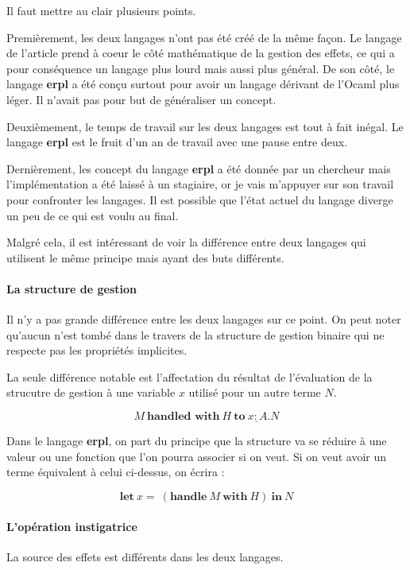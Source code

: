 Il faut mettre au clair plusieurs points. 

Premièrement, les deux langages n'ont pas été créé de la même façon.
Le langage de l'article prend à coeur le côté mathématique de la gestion des effets, ce qui a pour conséquence
un langage plus lourd mais aussi plus général. De son côté, le langage \textbf{erpl} a été conçu surtout pour 
avoir un langage dérivant de l'Ocaml plus léger. Il n'avait pas pour but de généraliser un concept.

Deuxièmement, le temps de travail sur les deux langages est tout à fait inégal. Le langage \textbf{erpl} est le fruit d'un 
an de travail avec une pause entre deux.

Dernièrement, les concept du langage \textbf{erpl} a été donnée par un chercheur mais l'implémentation a été laissé
à un stagiaire, or je vais m'appuyer sur son travail pour confronter les langages. Il est possible que l'état actuel
du langage diverge un peu de ce qui est voulu au final.

Malgré cela, il est intéressant de voir la différence entre deux langages qui utilisent le même principe mais ayant des buts 
différents.

\paragraph{La structure de gestion} Il n'y a pas grande différence entre les deux langages sur ce point.
On peut noter qu'aucun n'est tombé dans le travers de la structure de gestion binaire qui ne respecte pas
les propriétés implicites. 

La seule différence notable est l'affectation du résultat de l'évaluation de la strucutre de  gestion
à une variable $x$ utilisé pour un autre terme $N$.

\[M~\textbf{handled~with}~H~\underline{\textbf{to}~x:A.N}\]

Dans le langage \textbf{erpl}, on part du principe que la structure va se réduire à une valeur ou une fonction que l'on
pourra associer si on veut. Si on veut avoir un terme équivalent à celui ci-dessus, on écrira :

\[ \textbf{let}~x =~(\textbf{handle}~M~\textbf{with}~H)~\textbf{in}~N \]

\paragraph{L'opération instigatrice} La source des effets est différents dans les deux langages.



